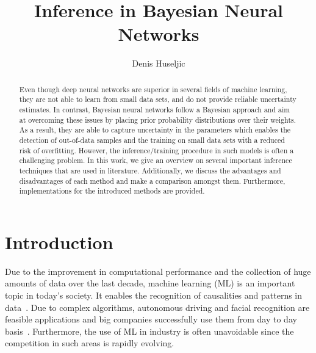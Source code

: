 \documentclass[runningheads]{llncs}
\title{Inference in Bayesian Neural Networks}
\begin{document}
\author{Denis Huseljic} 

\maketitle
\begin{abstract}
Even though deep neural networks are superior in several fields of machine learning, they are not able to learn from small data sets, and do not provide reliable uncertainty estimates.
In contrast, Bayesian neural networks follow a Bayesian approach and aim at overcoming these issues by placing prior probability distributions over their weights.
As a result, they are able to capture uncertainty in the parameters which enables the detection of out-of-data samples and the training on small data sets with a reduced risk of overfitting. However, the inference/training procedure in such models is often a challenging problem.
In this work, we give an overview on several important inference techniques that are used in literature.
Additionally, we discuss the advantages and disadvantages of each method and make a comparison amongst them.
Furthermore, implementations for the introduced methods are provided.
\end{abstract}


\section{Introduction}
Due to the improvement in computational performance and the collection of huge amounts of data over the last decade, machine learning (ML) is an important topic in today's society.
It enables the recognition of causalities and patterns in data~\cite{bishop:2006:PRML}.
Due to complex algorithms, autonomous driving and facial recognition are feasible applications and big companies successfully use them from day to day basis~\cite{krizhevsky2012imagenet}.
Furthermore, the use of ML in industry is often unavoidable since the competition in such areas is rapidly evolving.
\end{document}
